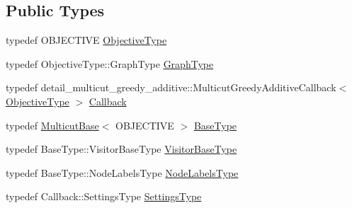 \subsection*{Public Types}
\begin{DoxyCompactItemize}
\item 
typedef O\+B\+J\+E\+C\+T\+I\+VE \hyperlink{classnifty_1_1graph_1_1opt_1_1multicut_1_1MulticutGreedyAdditive_a20bb4420504be890fcb487d70fa51dc0}{Objective\+Type}
\item 
typedef Objective\+Type\+::\+Graph\+Type \hyperlink{classnifty_1_1graph_1_1opt_1_1multicut_1_1MulticutGreedyAdditive_a16d23f12f0e53d32e27b273f9f4c8198}{Graph\+Type}
\item 
typedef detail\+\_\+multicut\+\_\+greedy\+\_\+additive\+::\+Multicut\+Greedy\+Additive\+Callback$<$ \hyperlink{classnifty_1_1graph_1_1opt_1_1multicut_1_1MulticutGreedyAdditive_a20bb4420504be890fcb487d70fa51dc0}{Objective\+Type} $>$ \hyperlink{classnifty_1_1graph_1_1opt_1_1multicut_1_1MulticutGreedyAdditive_ab933555fd4465da634c47187ccadc56e}{Callback}
\item 
typedef \hyperlink{classnifty_1_1graph_1_1opt_1_1multicut_1_1MulticutBase}{Multicut\+Base}$<$ O\+B\+J\+E\+C\+T\+I\+VE $>$ \hyperlink{classnifty_1_1graph_1_1opt_1_1multicut_1_1MulticutGreedyAdditive_a78c7e5b1fb156700df39da1c09e59f18}{Base\+Type}
\item 
typedef Base\+Type\+::\+Visitor\+Base\+Type \hyperlink{classnifty_1_1graph_1_1opt_1_1multicut_1_1MulticutGreedyAdditive_a3ff8100793fd975c52e79cdde194aa93}{Visitor\+Base\+Type}
\item 
typedef Base\+Type\+::\+Node\+Labels\+Type \hyperlink{classnifty_1_1graph_1_1opt_1_1multicut_1_1MulticutGreedyAdditive_a1a4aa1adf2a8d0183df965b535494225}{Node\+Labels\+Type}
\item 
typedef Callback\+::\+Settings\+Type \hyperlink{classnifty_1_1graph_1_1opt_1_1multicut_1_1MulticutGreedyAdditive_a074ee39f5884cff7359f5c0997929e2f}{Settings\+Type}
\end{DoxyCompactItemize}

